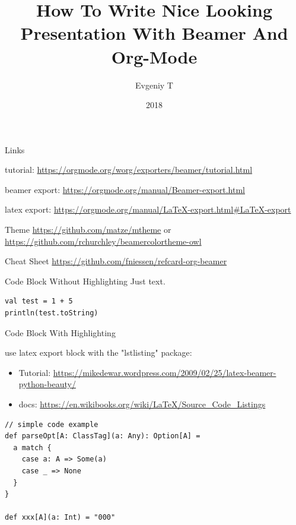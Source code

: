 \documentclass[10pt, presentation, colorlinks]{beamer}
\author{Evgeniy T}
\date{2018}
\title{How To Write Nice Looking Presentation With Beamer And Org-Mode}
\begin{document}
\maketitle

\begin{frame}[label={sec:org037e95c}]{Links}
\begin{block}{tutorial: \url{https://orgmode.org/worg/exporters/beamer/tutorial.html}}
\end{block}

\begin{block}{beamer export: \url{https://orgmode.org/manual/Beamer-export.html}}
\end{block}

\begin{block}{latex export: \url{https://orgmode.org/manual/LaTeX-export.html\#LaTeX-export}}
\end{block}

\begin{block}{Theme \url{https://github.com/matze/mtheme}  or  \url{https://github.com/rchurchley/beamercolortheme-owl}}
\end{block}

\begin{block}{Cheat Sheet  \url{https://github.com/fniessen/refcard-org-beamer}}
\end{block}

\end{frame}


\begin{frame}[fragile,label={sec:org1349e61}]{Code Block Without Highlighting}
 Just text.

\begin{verbatim}
val test = 1 + 5
println(test.toString)
\end{verbatim}

\end{frame}

\begin{frame}[fragile,label={sec:org0794629}]{Code Block With Highlighting}
\begin{block}{use latex export block with the "lstlisting" package:}
\begin{itemize}
\item Tutorial: \url{https://mikedewar.wordpress.com/2009/02/25/latex-beamer-python-beauty/}
\item docs: \url{https://en.wikibooks.org/wiki/LaTeX/Source\_Code\_Listings}
\end{itemize}


\begin{lstlisting}
// simple code example
def parseOpt[A: ClassTag](a: Any): Option[A] =
  a match {
    case a: A => Some(a)
    case _ => None
  }
}

def xxx[A](a: Int) = "000"
\end{lstlisting}
\end{block}
\end{frame}
\end{document}

